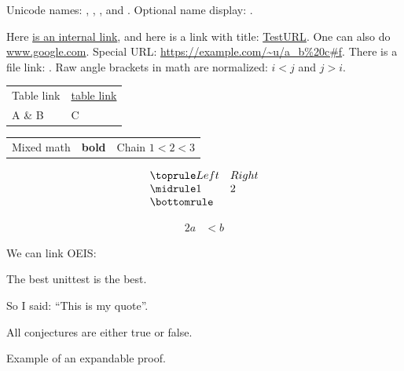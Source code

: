 Unicode names: ,
,
, and
.
Optional name display: .

Here \hyperref[testFamily]{is an internal link},
and here is a link with title: \href{https://en.wikipedia.org/wiki/Lindstr%C3%B6m%E2%80%93Gessel%E2%80%93Viennot_lemma}{TestURL}.
One can also do \url{www.google.com}.
Special URL: \url{https://example.com/~u/a_b%20c#f}.
There is a file link: .
Raw angle brackets in math are normalized: $i<j$ and \(j>i\).

\begin{tabular}{ll}
Table link & \hyperref[testFamily]{table link}\\
A \& B & C\\
\end{tabular}

\begin{tabular}{lll}
Mixed math & \textbf{bold} & Chain \(1\lt 2\lt 3\)\\
\end{tabular}

\[
\begin{array}{ll}
\toprule
Left & Right\\
\midrule
1 & 2\\
\bottomrule
\end{array}
\]

\begin{alignat*}{2}
a &< b
\end{alignat*}


We can link OEIS: 


\begin{blockquote}
The best unittest is the best.
\end{blockquote}

So I said: \enquote{This is my quote}.

\begin{figure}
\end{figure}


\begin{conjecture}
All conjectures are either true or false.
\end{conjecture}
\begin{proof*}
Example of an expandable proof.
\end{proof*}



